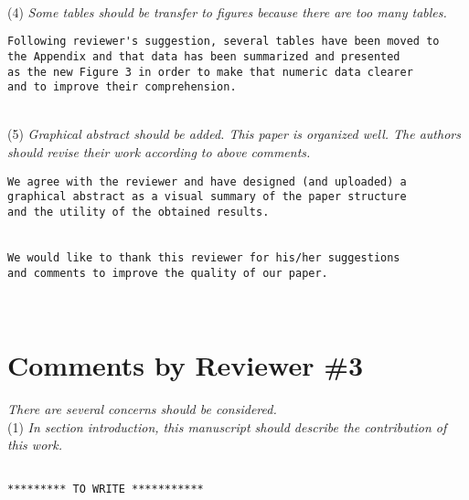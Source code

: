 \documentclass[preprint]{elsarticle}
\begin{document}
~\\
\noindent (4) \emph{Some tables should be transfer to figures because there are too many tables. } 

\begin{verbatim}
Following reviewer's suggestion, several tables have been moved to 
the Appendix and that data has been summarized and presented 
as the new Figure 3 in order to make that numeric data clearer 
and to improve their comprehension.
\end{verbatim}

~\\
\noindent (5) \emph{Graphical abstract should be added. This paper is organized well. The authors should revise their work according to above comments. } 

\begin{verbatim}
We agree with the reviewer and have designed (and uploaded) a 
graphical abstract as a visual summary of the paper structure 
and the utility of the obtained results.


We would like to thank this reviewer for his/her suggestions 
and comments to improve the quality of our paper.
\end{verbatim}

~\\


\section{Comments by Reviewer \#3}

\noindent \emph{There are several concerns should be considered.}\\

\noindent (1) \emph{In section introduction, this manuscript should describe the contribution of this work. } 

\begin{verbatim}

********* TO WRITE ***********

\end{verbatim}
\end{document}
